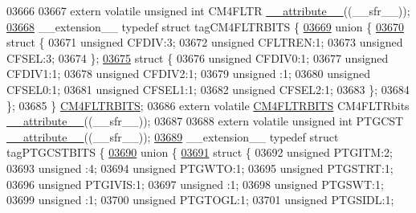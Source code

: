 \begin{DoxyCode}
03666 
03667 \textcolor{keyword}{extern} \textcolor{keyword}{volatile} \textcolor{keywordtype}{unsigned} \textcolor{keywordtype}{int}  CM4FLTR \hyperlink{a00009_a493c46f03454991ccc5aa7a6e1dfb2a7}{\_\_attribute\_\_}((\_\_sfr\_\_));
\hypertarget{a00009_source_l03668}{}\hyperlink{a00008}{03668} \_\_extension\_\_ \textcolor{keyword}{typedef} \textcolor{keyword}{struct }tagCM4FLTRBITS \{
\hypertarget{a00009_source_l03669}{}\hyperlink{a00009}{03669}   \textcolor{keyword}{union }\{
\hypertarget{a00009_source_l03670}{}\hyperlink{a00009}{03670}     \textcolor{keyword}{struct }\{
03671       \textcolor{keywordtype}{unsigned} CFDIV:3;
03672       \textcolor{keywordtype}{unsigned} CFLTREN:1;
03673       \textcolor{keywordtype}{unsigned} CFSEL:3;
03674     \};
\hypertarget{a00009_source_l03675}{}\hyperlink{a00009}{03675}     \textcolor{keyword}{struct }\{
03676       \textcolor{keywordtype}{unsigned} CFDIV0:1;
03677       \textcolor{keywordtype}{unsigned} CFDIV1:1;
03678       \textcolor{keywordtype}{unsigned} CFDIV2:1;
03679       \textcolor{keywordtype}{unsigned} :1;
03680       \textcolor{keywordtype}{unsigned} CFSEL0:1;
03681       \textcolor{keywordtype}{unsigned} CFSEL1:1;
03682       \textcolor{keywordtype}{unsigned} CFSEL2:1;
03683     \};
03684   \};
03685 \} \hyperlink{a00008_dc/d50/a00332}{CM4FLTRBITS};
03686 \textcolor{keyword}{extern} \textcolor{keyword}{volatile} \hyperlink{a00008_dc/d50/a00332}{CM4FLTRBITS} CM4FLTRbits \hyperlink{a00009_a493c46f03454991ccc5aa7a6e1dfb2a7}{\_\_attribute\_\_}((\_\_sfr\_\_));
03687 
03688 \textcolor{keyword}{extern} \textcolor{keyword}{volatile} \textcolor{keywordtype}{unsigned} \textcolor{keywordtype}{int}  PTGCST \hyperlink{a00009_a493c46f03454991ccc5aa7a6e1dfb2a7}{\_\_attribute\_\_}((\_\_sfr\_\_));
\hypertarget{a00009_source_l03689}{}\hyperlink{a00008}{03689} \_\_extension\_\_ \textcolor{keyword}{typedef} \textcolor{keyword}{struct }tagPTGCSTBITS \{
\hypertarget{a00009_source_l03690}{}\hyperlink{a00009}{03690}   \textcolor{keyword}{union }\{
\hypertarget{a00009_source_l03691}{}\hyperlink{a00009}{03691}     \textcolor{keyword}{struct }\{
03692       \textcolor{keywordtype}{unsigned} PTGITM:2;
03693       \textcolor{keywordtype}{unsigned} :4;
03694       \textcolor{keywordtype}{unsigned} PTGWTO:1;
03695       \textcolor{keywordtype}{unsigned} PTGSTRT:1;
03696       \textcolor{keywordtype}{unsigned} PTGIVIS:1;
03697       \textcolor{keywordtype}{unsigned} :1;
03698       \textcolor{keywordtype}{unsigned} PTGSWT:1;
03699       \textcolor{keywordtype}{unsigned} :1;
03700       \textcolor{keywordtype}{unsigned} PTGTOGL:1;
03701       \textcolor{keywordtype}{unsigned} PTGSIDL:1;

\end{DoxyCode}
